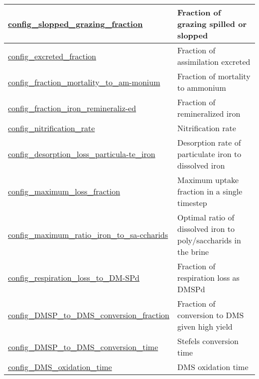 {\begin{center}
\begin{longtable}{| p{2.0in} || p{4.0in} |}
    \hline
    \hyperref[subsec:nm_sec_config_slopped_grazing_fraction]{config\_slopped\_grazing\_fraction} & Fraction of grazing spilled or slopped \\
    \hline
    \hyperref[subsec:nm_sec_config_excreted_fraction]{config\_excreted\_fraction} & Fraction of assimilation excreted \\
    \hline
    \hyperref[subsec:nm_sec_config_fraction_mortality_to_ammonium]{config\_fraction\_mortality\_to\_am-}\hyperref[subsec:nm_sec_config_fraction_mortality_to_ammonium]{monium}& Fraction of mortality to ammonium \\
    \hline
    \hyperref[subsec:nm_sec_config_fraction_iron_remineralized]{config\_fraction\_iron\_remineraliz-}\hyperref[subsec:nm_sec_config_fraction_iron_remineralized]{ed}& Fraction of remineralized iron  \\
    \hline
    \hyperref[subsec:nm_sec_config_nitrification_rate]{config\_nitrification\_rate} & Nitrification rate \\
    \hline
    \hyperref[subsec:nm_sec_config_desorption_loss_particulate_iron]{config\_desorption\_loss\_particula-}\hyperref[subsec:nm_sec_config_desorption_loss_particulate_iron]{te\_iron}& Desorption rate of particulate iron to dissolved iron \\
    \hline
    \hyperref[subsec:nm_sec_config_maximum_loss_fraction]{config\_maximum\_loss\_fraction} & Maximum uptake fraction in a single timestep \\
    \hline
    \hyperref[subsec:nm_sec_config_maximum_ratio_iron_to_saccharids]{config\_maximum\_ratio\_iron\_to\_sa-}\hyperref[subsec:nm_sec_config_maximum_ratio_iron_to_saccharids]{ccharids}& Optimal ratio of dissolved iron to poly/saccharids in the brine \\
    \hline
    \hyperref[subsec:nm_sec_config_respiration_loss_to_DMSPd]{config\_respiration\_loss\_to\_DM-}\hyperref[subsec:nm_sec_config_respiration_loss_to_DMSPd]{SPd}& Fraction of respiration loss as DMSPd \\
    \hline
    \hyperref[subsec:nm_sec_config_DMSP_to_DMS_conversion_fraction]{config\_DMSP\_to\_DMS\_conversion\_fraction} & Fraction of conversion to DMS given high yield \\
    \hline
    \hyperref[subsec:nm_sec_config_DMSP_to_DMS_conversion_time]{config\_DMSP\_to\_DMS\_conversion\_time} & Stefels conversion time \\
    \hline
    \hyperref[subsec:nm_sec_config_DMS_oxidation_time]{config\_DMS\_oxidation\_time} & DMS oxidation time \\

\end{longtable}
\end{center}}
